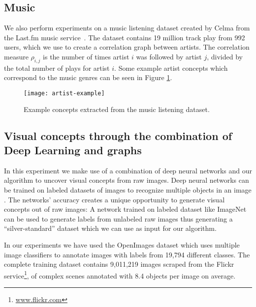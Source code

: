 \subsection{Music}

We also perform experiments on a music listening dataset created by Celma from
the Last.fm music service~\cite{celma-long-tail}. The dataset contains 19 million
track play from 992 users, which we use to create a correlation graph between
artists. The correlation measure $\rho_{i, j}$ is the number of times artist $i$ was followed
by artist $j$, divided by the total number of plays for artist $i$. Some example
artist concepts which correspond to the music genres can be seen in Figure
\ref{fig:concepts-artists}.

\begin{figure}
	\centering
	\texttt{[image: artist-example]}
	\caption{Example concepts extracted from the music listening dataset.}
	\label{fig:concepts-artists}
\end{figure}

\subsection{Visual concepts through the combination of Deep Learning and graphs}

\label{sec:concepts-openimages}

In this experiment we make use of a combination of deep neural networks and our
algorithm to uncover visual concepts from raw images. Deep neural networks
can be trained on labeled datasets of images to recognize multiple objects
in an image \cite{deep-learning}. The networks' accuracy creates a unique opportunity
to generate visual concepts out of raw images: A network trained on labeled dataset
like ImageNet \cite{imagenet} can be used to generate labels from unlabeled raw images thus generating
a ``silver-standard'' dataset which we can use as input for our algorithm.

In our experiments we have used the OpenImages dataset \cite{openimages} which uses
multiple image classifiers to annotate images with labels from 19,794 different
classes. The complete training
dataset contains 9,011,219 images scraped from the Flickr service\footnote{\url{www.flickr.com}}, of complex scenes annotated with 8.4 objects per image on average.


